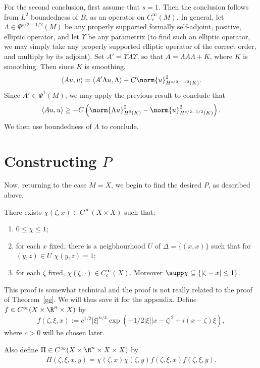 \documentclass[12pt]{article}
\begin{document}
For the second conclusion, first assume that $s=1$. Then the conclusion follows from $L^2$ boundedness of $B$, as an operator on $C_c^\infty(M)$. In general, let $\Lambda \in \Psi^{s/2-1/2}(M)$ be any properly supported formally self-adjoint, positive, elliptic operator, and let $\Upsilon$ be any parametrix (to find such an elliptic operator, we may simply take any properly supported elliptic operator of the correct order, and multiply by its adjoint). Set $A' = \Upsilon A \Upsilon$, so that $A = \Lambda A \Lambda + K$, where $K$ is smoothing. Then since $K$ is smoothing,
\[\langle Au,u\rangle = \langle A'\Lambda u,\Lambda\rangle -C \norm{u}^2_{H^{s/2-1/2}(K)}.\]
Since $A' \in \Psi^1(M)$, we may apply the previous result to conclude that
\[\langle Au,u\rangle \geq -C\left(\norm{\Lambda u}^2_{H^{0}(K)} - \norm{u}^2_{H^{s/2-1/2}(K)}\right).\]
We then use boundedness of $\Lambda$ to conclude.

\section{Constructing $P$}

Now, returning to the case $M=X$, we begin to find the desired $P$, as described above.
\begin{lem}\label{app}There exists $\chi(\zeta,x) \in C^\infty(X\times X)$ such that:
\begin{enumerate}[label = (\roman*)]
\item $0 \leq \chi \leq 1$;
\item for each $x$ fixed, there is a neigbhourhood $U$ of $\Delta = \{(x,x)\}$ such that for $(y,z) \in U$ $\chi(y,z) = 1$;
\item for each $\zeta$ fixed, $\chi(\zeta,\cdot) \in C_c^\infty(X)$. Moreover $\supp \chi \subseteq \{|\zeta-x| \leq 1\}$.\end{enumerate}
\end{lem}
This proof is somewhat technical and the proof is not really related to the proof of Theorem~\ref{ge}. We will thus save it for the appendix.
Define $f \in C^\infty(X\times \R^n \times X)$ by
\[f(\zeta,\xi,x) := c^{1/2}|\xi|^{n/4}\exp(-1/2|\xi||x-\zeta|^2+i(x-\zeta)\xi),\] where $c > 0$ will be chosen later.

Also define $\Pi \in C^\infty(X\times \R^n\times X \times X)$ by
\[\Pi(\zeta,\xi,x,y) = \chi(\zeta,x)\chi(\zeta,y)f(\zeta,\xi,x)\overline{f(\zeta,\xi,y)}.\]
\end{document}
